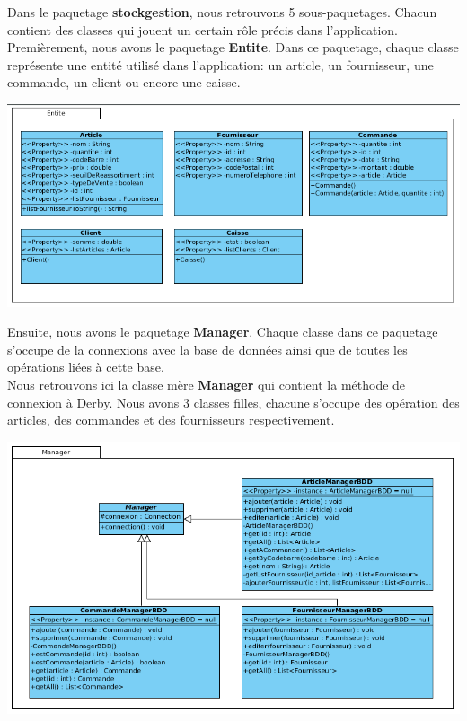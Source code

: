 Dans le paquetage \textbf{stockgestion}, nous retrouvons 5 sous-paquetages. Chacun contient des classes qui jouent un certain rôle précis dans l'application.\\

Premièrement, nous avons le paquetage \textbf{Entite}. Dans ce paquetage, chaque classe représente une entité utilisé dans l'application: un article, un fournisseur, une commande, un client ou encore une caisse.

\begin{center}
\includegraphics[width=14cm]{./Conception/entite}
\end{center}

Ensuite, nous avons le paquetage \textbf{Manager}. Chaque classe dans ce paquetage s'occupe de la connexions avec la base de données ainsi que de toutes les opérations liées à cette base.\\
Nous retrouvons ici la classe mère \textbf{Manager} qui contient la méthode de connexion à Derby. Nous avons 3 classes filles, chacune s'occupe des opération des articles, des commandes et des fournisseurs respectivement.

\begin{center}
\includegraphics[width=14cm]{./Conception/manager}
\end{center}

